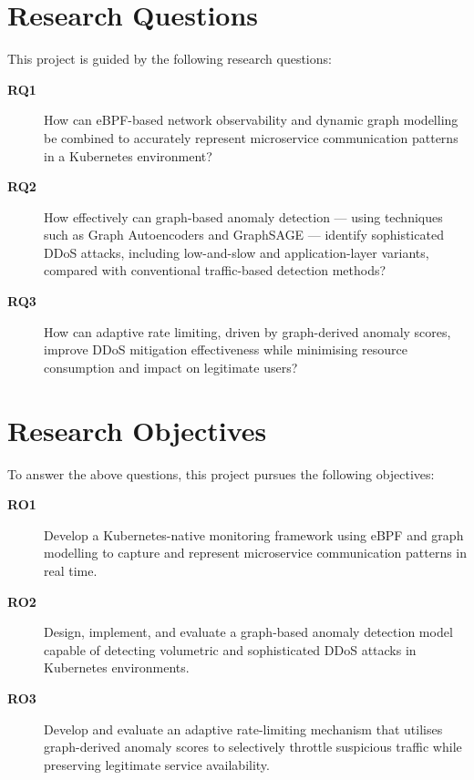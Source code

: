 \section{Research Questions}
\label{sec:rqs}

This project is guided by the following research questions:

\begin{description}
  \item[\textbf{RQ1}] How can eBPF-based network observability and dynamic graph modelling
  be combined to accurately represent microservice communication patterns in a Kubernetes
  environment?

  \item[\textbf{RQ2}] How effectively can graph-based anomaly detection --- using
  techniques such as Graph Autoencoders and GraphSAGE --- identify sophisticated DDoS
  attacks, including low-and-slow and application-layer variants, compared with
  conventional traffic-based detection methods?

  \item[\textbf{RQ3}] How can adaptive rate limiting, driven by graph-derived anomaly
  scores, improve DDoS mitigation effectiveness while minimising resource consumption and
  impact on legitimate users?
\end{description}

\section{Research Objectives}
\label{sec:objectives}

To answer the above questions, this project pursues the following objectives:

\begin{description}
  \item[\textbf{RO1}] Develop a Kubernetes-native monitoring framework using eBPF and
  graph modelling to capture and represent microservice communication patterns in real time.

  \item[\textbf{RO2}] Design, implement, and evaluate a graph-based anomaly detection
  model capable of detecting volumetric and sophisticated DDoS attacks in Kubernetes
  environments.

  \item[\textbf{RO3}] Develop and evaluate an adaptive rate-limiting mechanism that
  utilises graph-derived anomaly scores to selectively throttle suspicious traffic while
  preserving legitimate service availability.
\end{description}

